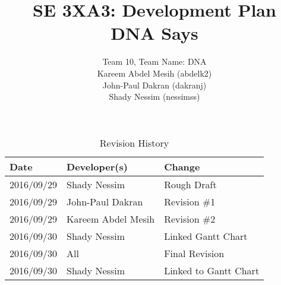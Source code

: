 \documentclass{article}
\title{SE 3XA3: Development Plan\\DNA Says}
\author{Team 10, Team Name: DNA
		\\ Kareem Abdel Mesih (abdelk2)
		\\ John-Paul Dakran (dakranj)
		\\ Shady Nessim (nessimss)
}
\date{}
\begin{document}
\begin{table}[hp]
\caption{Revision History} \label{TblRevisionHistory}
\begin{tabularx}{\textwidth}{llX}
\toprule
\textbf{Date} & \textbf{Developer(s)} & \textbf{Change}\\
\midrule
2016/09/29 & Shady Nessim & Rough Draft\\
2016/09/29 & John-Paul Dakran &  Revision \#1\\
2016/09/29 & Kareem Abdel Mesih &  Revision \#2\\
2016/09/30 & Shady Nessim & Linked Gantt Chart\\
2016/09/30 & All & Final Revision\\
2016/09/30 & Shady Nessim & Linked to Gantt Chart\\
\bottomrule
\end{tabularx}
\end{table}
\newpage
\maketitle
\newpage
\end{document}
